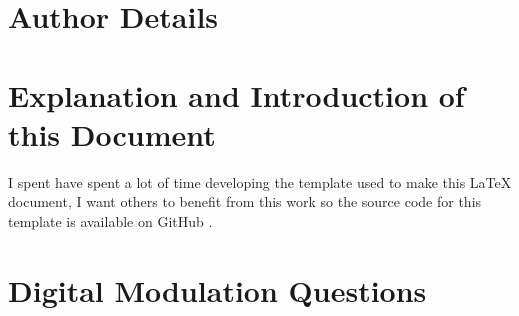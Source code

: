 \documentclass[colorlinks,11pt,a4paper,normalphoto,withhyper,ragged2e]{altareport}
\begin{document}
	
	\MakeReportTitlePage
	
	
	\setcounter{page}{1}
	
	
	
	
	\section*{Author Details}
	
		\makeauthordetails
		
		
		
		\setcounter{tocdepth}{4} 
		\tableofcontents %
	
	
	
	
	\fontsize{11pt}{12pt}\selectfont %
	
	\abovedisplayskip=0pt
	\abovedisplayshortskip=2pt
	\belowdisplayskip=12pt
	\belowdisplayshortskip=12pt
	
	
	
	
	
	\section*{Explanation and Introduction of this Document}
		I spent have spent a lot of time developing the template used to make this {\LaTeX} document, I want others to benefit from this work so the source code for this template is available on GitHub \cite{latex_template_github}.
		
		
	\newpage
	
	
	\section{Digital Modulation Questions}
\end{document}
